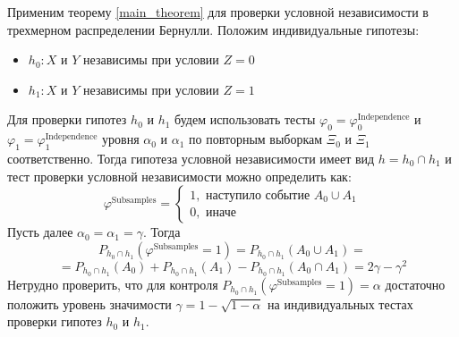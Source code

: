 Применим теорему \ref{main_theorem} для проверки условной независимости в трехмерном
распределении Бернулли.
Положим индивидуальные гипотезы:
\begin{itemize}
    \item $h_0 : X$ и $Y$ независимы при условии $Z=0$
    \item $h_1 : X$ и $Y$ независимы при условии $Z=1$
\end{itemize}
Для проверки гипотез $h_0$ и $h_1$ будем использовать тесты
$\varphi_0 = \varphi^{\text{Independence}}_0$ и 
$\varphi_1 = \varphi^{\text{Independence}}_1$ уровня $\alpha_0$ и $\alpha_1$ 
по повторным выборкам
$\Xi_0$ и $\Xi_1$ соответственно.
Тогда гипотеза
условной независимости имеет вид $h = h_0 \cap h_1$ и тест проверки условной независимости можно определить как:
$$
\varphi^{\text{Subsamples}}=\begin{cases}
    1, \text{ наступило событие $A_0 \cup A_1$}\\
    0, \text{ иначе}
\end{cases}
$$
Пусть далее $\alpha_0 = \alpha_1 = \gamma$.
Тогда $$P_{h_0 \cap h_1}(\varphi^{\text{Subsamples}}=1)=P_{h_0 \cap h_1}(A_0 \cup A_1)=$$ 
$$ = P_{h_0 \cap h_1}(A_0) + P_{h_0 \cap h_1}(A_1) - 
P_{h_0 \cap h_1}(A_0 \cap A_1) = 2\gamma - \gamma^2$$
Нетрудно проверить, что для контроля $P_{h_0 \cap h_1}(\varphi^{\text{Subsamples}}=1)=\alpha$ достаточно положить
уровень значимости $\gamma = 1 - \sqrt{1-\alpha}$ на индивидуальных
тестах проверки гипотез $h_0$ и $h_1$.
